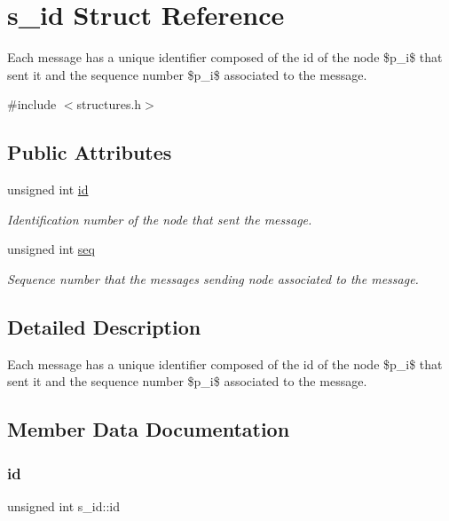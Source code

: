 \hypertarget{structs__id}{}\section{s\+\_\+id Struct Reference}
\label{structs__id}


Each message has a unique identifier composed of the id of the node \$p\+\_\+i\$ that sent it and the sequence number \$p\+\_\+i\$ associated to the message.  




{\ttfamily \#include $<$structures.\+h$>$}

\subsection*{Public Attributes}
\begin{DoxyCompactItemize}
\item 
unsigned int \hyperlink{structs__id_a5c4ca3342296868576159a20ebe9909d}{id}
\begin{DoxyCompactList}\small\item\em Identification number of the node that sent the message. \end{DoxyCompactList}\item 
unsigned int \hyperlink{structs__id_aa384054b68c5bfb4ed4a230e6a0e895f}{seq}
\begin{DoxyCompactList}\small\item\em Sequence number that the message\textquotesingle{}s sending node associated to the message. \end{DoxyCompactList}\end{DoxyCompactItemize}


\subsection{Detailed Description}
Each message has a unique identifier composed of the id of the node \$p\+\_\+i\$ that sent it and the sequence number \$p\+\_\+i\$ associated to the message. 

\subsection{Member Data Documentation}
\mbox{\label{structs__id_a5c4ca3342296868576159a20ebe9909d}} 
\subsubsection{\texorpdfstring{id}{id}}
{\footnotesize\ttfamily unsigned int s\+\_\+id\+::id}



